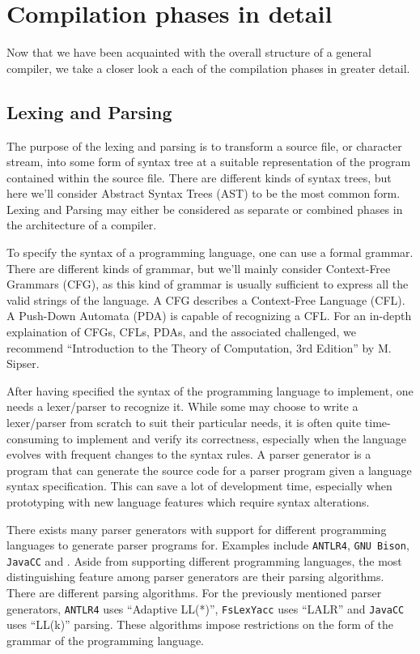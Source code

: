 \section{Compilation phases in detail}

Now that we have been acquainted with the overall structure of a general compiler, we take a closer look a each of the compilation phases in greater detail.

\subsection{Lexing and Parsing}

The purpose of the lexing and parsing is to transform a source file, or character stream, into some form of syntax tree at a suitable representation of
the program contained within the source file. There are different kinds of syntax trees, but here we'll consider Abstract Syntax Trees (AST) to be the
most common form. Lexing and Parsing may either be considered as separate or combined phases in the architecture of a compiler.

To specify the syntax of a programming language, one can use a formal grammar. There are different kinds of grammar, but we'll mainly consider Context-Free
Grammars (CFG), as this kind of grammar is usually sufficient to express all the valid strings of the language. A CFG describes a Context-Free Language (CFL).
A Push-Down Automata (PDA) is capable of recognizing a CFL. For an in-depth explaination of CFGs, CFLs, PDAs, and the associated challenged, we
recommend ``Introduction to the Theory of Computation, 3rd Edition'' by M. Sipser.

After having specified the syntax of the programming language to implement, one needs a lexer/parser to recognize it. While some may choose to write a lexer/parser
from scratch to suit their particular needs, it is often quite time-consuming to implement and verify its correctness, especially when the language evolves with
frequent changes to the syntax rules. A parser generator is a program that can generate the source code for a parser program given a language syntax specification.
This can save a lot of development time, especially when prototyping with new language features which require syntax alterations.

There exists many parser generators with support for different programming languages to generate parser programs for. Examples include \texttt{ANTLR4}, \texttt{GNU Bison},
\texttt{JavaCC} and . Aside from supporting different programming languages, the most distinguishing feature among parser generators are their parsing algorithms.
There are different parsing algorithms. For the previously mentioned parser generators, \texttt{ANTLR4} uses ``Adaptive LL(*)'', \texttt{FsLexYacc} uses ``LALR'' and \texttt{JavaCC}
uses ``LL(k)'' parsing. These algorithms impose restrictions on the form of the grammar of the programming language.

